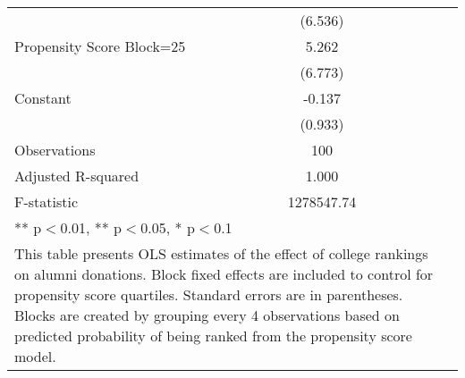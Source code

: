\begin{tabular}{l*{4}{c}}
                    &       (6.536)         \\
Propensity Score Block=25&       5.262         \\
                    &       (6.773)         \\
Constant            &      -0.137         \\
                    &       (0.933)         \\
\hline
Observations        &         100         \\
Adjusted R-squared  &       1.000         \\
F-statistic         &  1278547.74         \\
\hline\hline
\multicolumn{4}{p{0.6\linewidth}}{\small *** p$<$0.01, ** p$<$0.05, * p$<$0.1} \\
\multicolumn{4}{p{0.6\linewidth}}{\footnotesize This table presents OLS estimates of the effect of college rankings on alumni donations. Block fixed effects are included to control for propensity score quartiles. Standard errors are in parentheses. Blocks are created by grouping every 4 observations based on predicted probability of being ranked from the propensity score model.}\\
\end{tabular}